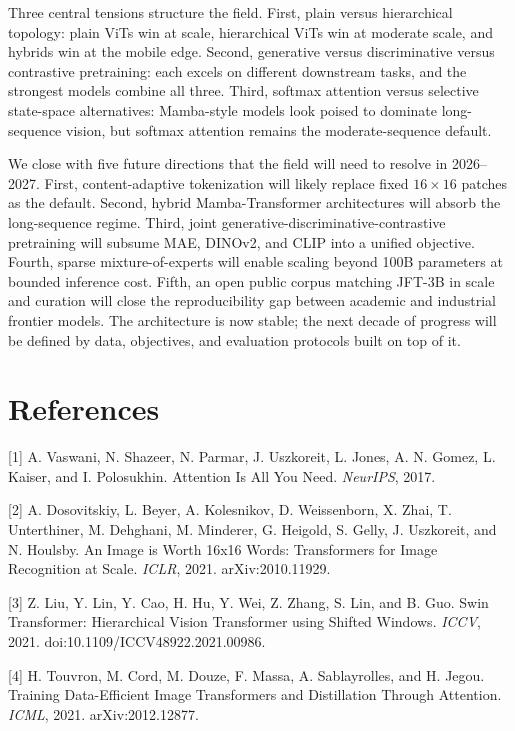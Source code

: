 Three central tensions structure the field. First, plain versus hierarchical topology: plain ViTs win at scale, hierarchical ViTs win at moderate scale, and hybrids win at the mobile edge. Second, generative versus discriminative versus contrastive pretraining: each excels on different downstream tasks, and the strongest models combine all three. Third, softmax attention versus selective state-space alternatives: Mamba-style models look poised to dominate long-sequence vision, but softmax attention remains the moderate-sequence default.

We close with five future directions that the field will need to resolve in 2026--2027. First, content-adaptive tokenization will likely replace fixed \(16 \times 16\) patches as the default. Second, hybrid Mamba-Transformer architectures will absorb the long-sequence regime. Third, joint generative-discriminative-contrastive pretraining will subsume MAE, DINOv2, and CLIP into a unified objective. Fourth, sparse mixture-of-experts will enable scaling beyond 100B parameters at bounded inference cost. Fifth, an open public corpus matching JFT-3B in scale and curation will close the reproducibility gap between academic and industrial frontier models. The architecture is now stable; the next decade of progress will be defined by data, objectives, and evaluation protocols built on top of it.

\section{References}\label{references}

{[}1{]} A. Vaswani, N. Shazeer, N. Parmar, J. Uszkoreit, L. Jones, A. N. Gomez, L. Kaiser, and I. Polosukhin. Attention Is All You Need. \emph{NeurIPS}, 2017.

{[}2{]} A. Dosovitskiy, L. Beyer, A. Kolesnikov, D. Weissenborn, X. Zhai, T. Unterthiner, M. Dehghani, M. Minderer, G. Heigold, S. Gelly, J. Uszkoreit, and N. Houlsby. An Image is Worth 16x16 Words: Transformers for Image Recognition at Scale. \emph{ICLR}, 2021. arXiv:2010.11929.

{[}3{]} Z. Liu, Y. Lin, Y. Cao, H. Hu, Y. Wei, Z. Zhang, S. Lin, and B. Guo. Swin Transformer: Hierarchical Vision Transformer using Shifted Windows. \emph{ICCV}, 2021. doi:10.1109/ICCV48922.2021.00986.

{[}4{]} H. Touvron, M. Cord, M. Douze, F. Massa, A. Sablayrolles, and H. Jegou. Training Data-Efficient Image Transformers and Distillation Through Attention. \emph{ICML}, 2021. arXiv:2012.12877.

